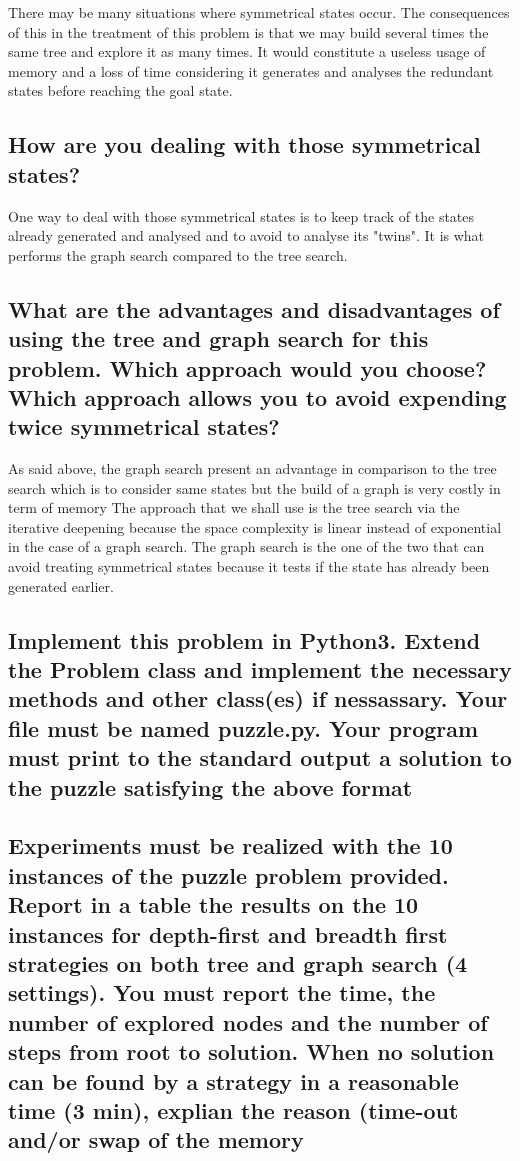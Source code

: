 \documentclass[a4paper,10pt]{article}
\begin{document}
	There may be many situations where symmetrical states occur. The consequences of this in the treatment of this problem	is that we may build several times the same tree and explore it as many times. It would constitute a useless usage of memory and a loss of time considering it generates and analyses the redundant states before reaching the goal state.
	
	\subsection{How are you dealing with those symmetrical states?}
	
	One way to deal with those symmetrical states is to keep track of the states already generated and analysed and to avoid to analyse its "twins". It is what performs the graph search compared to the tree search.
	
	\subsection{What are the advantages and disadvantages of using the tree and graph search for this problem. Which approach would you choose? Which approach allows you to avoid expending twice symmetrical states?}

	As said above, the graph search present an advantage in comparison to the tree search which is to consider same states but the build of a graph is very costly in term of memory The approach that we shall use is the tree search via the iterative deepening because the space complexity is linear instead of exponential in the case of a graph search.
	The graph search is the one of the two that can avoid treating symmetrical states because it tests if the state has already been generated earlier.
	
	\subsection{Implement this problem in Python3. Extend the Problem class and implement the necessary methods and other class(es) if nessassary. Your file must be named puzzle.py. Your program must print to the standard output a solution to the puzzle satisfying the above format}
	
	\subsection{Experiments must be realized with the 10 instances of the puzzle problem provided. Report in a table the results on the 10 instances for depth-first and breadth first strategies on both tree and graph search (4 settings). You must report the time, the number of explored nodes and the number of steps from root to solution. When no solution can be found by a strategy in a reasonable time (3 min), explian the reason (time-out and/or swap of the memory}
	
\end{document}
